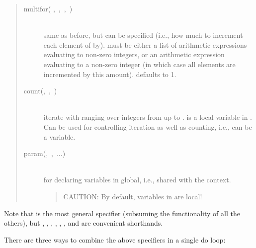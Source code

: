 \begin{quote}
\begin{description}
\item[multifor(%
,~,~,~)]%
\mbox{}\\
    same as before, but  can be specified (i.e., how
    much to increment each element of  by).
     must be
    either a list of arithmetic expressions evaluating to non-zero
    integers, or an arithmetic expression evaluating to a non-zero
    integer (in which case all elements are incremented by this
    amount).   defaults to 1.

\item[count(,~,~)]%
\mbox{}\\
    iterate  with  ranging over integers from 
    up to .
     is a local variable in .
    Can be used for controlling iteration as well as counting,
    i.e.,  can be a variable.

\item[param(,~,~...)]%
\mbox{}\\
    for declaring variables in  global, i.e., shared with the
    context.
    \begin{quotation}
      CAUTION: By default, variables in  are local!
    \end{quotation}
\end{description}
\end{quote}

Note that  is the most general specifier (subsuming the
functionality of all the others), but ,
,
, , ,
,  and
 are convenient shorthands.

There are three ways to combine the above specifiers in a single do loop:

